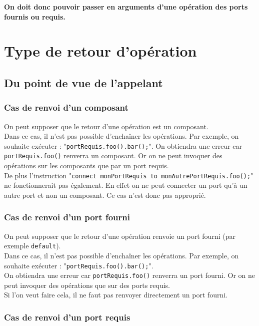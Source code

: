 \documentclass[11pt,a4paper,openany,oneside]{book}
\begin{document}
\textbf{On doit donc pouvoir passer en arguments d'une opération des ports fournis ou requis.}

\section{Type de retour d'opération}

\subsection{Du point de vue de l'appelant}

\subsubsection{Cas de renvoi d'un composant}
On peut supposer que le retour d'une opération est un composant.\\
Dans ce cas, il n'est pas possible d'enchaîner les opérations. Par exemple, on souhaite exécuter : "\texttt{portRequis.foo().bar();}". On obtiendra une erreur car \texttt{portRequis.foo()} renverra un composant. Or on ne peut invoquer des opérations sur les composants que par un port requis.\\
De plus l'instruction "\texttt{connect monPortRequis to monAutrePortRequis.foo();}" ne fonctionnerait pas également. En effet on ne peut connecter un port qu'à un autre port et non un composant. Ce cas n'est donc pas approprié.

\subsubsection{Cas de renvoi d'un port fourni}
On peut supposer que le retour d'une opération renvoie un port fourni (par exemple \texttt{default}).\\
Dans ce cas, il n'est pas possible d'enchaîner les opérations. Par exemple, on souhaite exécuter : "\texttt{portRequis.foo().bar();}".\\
On obtiendra une erreur car \texttt{portRequis.foo()} renverra un port fourni. Or on ne peut invoquer des opérations que sur des ports requis.\\
Si l'on veut faire cela, il ne faut pas renvoyer directement un port fourni.

\subsubsection{Cas de renvoi d'un port requis}
\end{document}
